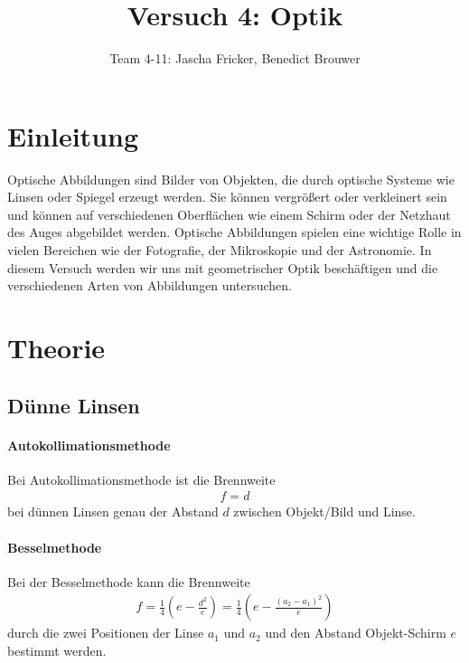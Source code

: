 \documentclass[11pt, a4paper]{article}
\title{Versuch 4: Optik}
\author{Team 4-11: Jascha Fricker, Benedict Brouwer}
\begin{document}
    \maketitle

    \tableofcontents

    \newpage

    \section{Einleitung}
    Optische Abbildungen sind Bilder von Objekten, die durch optische Systeme wie Linsen oder Spiegel erzeugt werden. Sie können vergrößert oder verkleinert sein und können auf verschiedenen Oberflächen wie einem Schirm oder der Netzhaut des Auges abgebildet werden. Optische Abbildungen spielen eine wichtige Rolle in vielen Bereichen wie der Fotografie, der Mikroskopie und der Astronomie. In diesem Versuch werden wir uns mit geometrischer Optik beschäftigen und die verschiedenen Arten von Abbildungen untersuchen.

    \section{Theorie}

    \subsection{Dünne Linsen}
    \paragraph{Autokollimationsmethode}
    Bei Autokollimationsmethode ist die Brennweite
    \begin{align}
        f = d \label{eq:auto}
    \end{align}
    bei dünnen Linsen genau der Abstand $d$ zwischen Objekt/Bild und Linse.
    \paragraph{Besselmethode}
    Bei der Besselmethode kann die Brennweite
    \begin{align}
        f = \frac{1}{4} \left( e - \frac{d^2}{e} \right) = \frac{1}{4} \left( e - \frac{\left(a_2 - a_1\right)^2}{e} \right) \label{eq:bessel}
    \end{align}
    durch die zwei Positionen der Linse $a_1$ und $a_2$ und den Abstand Objekt-Schirm $e$ bestimmt werden.
    
\end{document}
